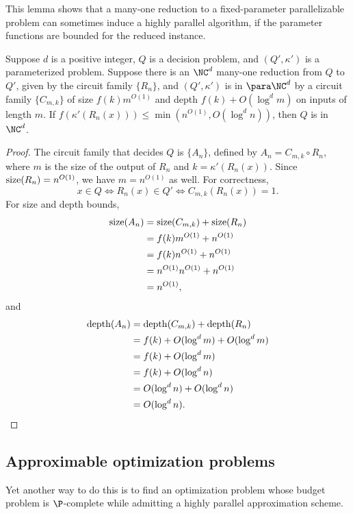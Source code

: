 This lemma shows that a many-one reduction to a fixed-parameter parallelizable problem can sometimes induce a highly parallel algorithm, if the parameter functions are bounded for the reduced instance.

\begin{lemma}\label{lem:reducetonc}
  Suppose $d$ is a positive integer, $Q$ is a decision problem, and $(Q', \kappa')$ is a parameterized problem.
  Suppose there is an $\NC^d$ many-one reduction from $Q$ to $Q'$, given by the circuit family $\{R_n\}$, and $(Q', \kappa')$ is in $\para \NC^d$ by a circuit family $\{C_{m, k}\}$ of size $f(k) m^{O(1)}$ and depth $f(k) + O(\log^d m)$ on inputs of length $m$.
  If $f(\kappa'(R_n(x))) \leq \min(n^{O(1)}, O(\log^d n))$, then $Q$ is in $\NC^d$.
\end{lemma}
\begin{proof}
  The circuit family that decides $Q$ is $\{A_n\}$, defined by $A_n = C_{m, k} \circ R_n$, where $m$ is the size of the output of $R_n$ and $k = \kappa'(R_n(x))$.
  Since $\operatorname{size}(R_n) = n^{O(1)}$, we have $m = n^{O(1)}$ as well.
  For correctness,
  \[
  x \in Q \iff R_n(x) \in Q' \iff C_{m, k}(R_n(x)) = 1.
  \]
  For size and depth bounds,
  \begin{align*}
    \operatorname{size}(A_n) & = \operatorname{size}(C_{m, k}) + \operatorname{size}(R_n) \\
    & = f(k) m^{O(1)} + n^{O(1)} \\
    & = f(k) n^{O(1)} + n^{O(1)} \\
    & = n^{O(1)} n^{O(1)} + n^{O(1)} \\
    & = n^{O(1)},
  \end{align*}
  and
  \begin{align*}
    \operatorname{depth}(A_n) & = \operatorname{depth}(C_{m, k}) + \operatorname{depth}(R_n) \\
    & = f(k) + O(\log^d m) + O(\log^d m) \\
    & = f(k) + O(\log^d m) \\
    & = f(k) + O(\log^d n) \\
    & = O(\log^d n) + O(\log^d n) \\
    & = O(\log^d n). \qedhere
  \end{align*}
\end{proof}

\subsection{Approximable optimization problems}

Yet another way to do this is to find an optimization problem whose budget problem is $\P$-complete while admitting a highly parallel approximation scheme.

